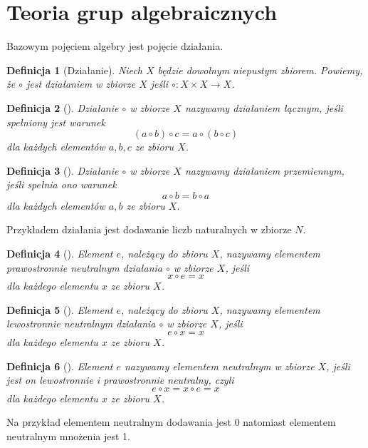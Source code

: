 \documentclass[12pt,a4paper]{report}
\newtheorem{definition}{Definicja}[chapter]
\begin{document}
\section{Teoria grup algebraicznych}

Bazowym pojęciem algebry jest pojęcie działania.

\begin{definition}[Działanie{\citep[Sec 4.1]{jedrzejewski2011algebra}}]
Niech $X$ będzie dowolnym niepustym zbiorem. Powiemy, że $\circ$ jest działaniem w zbiorze $X$ jeśli $\circ: X \times X \to X$.
\end{definition}


\begin{definition}[{\citep[Sec 4.1 Def. 4.3]{jedrzejewski2011algebra}}]
Działanie $\circ$ w zbiorze $X$ nazywamy działaniem łącznym, jeśli spełniony jest warunek 
\begin{equation*}
(a\circ b)\circ c = a\circ(b\circ c)
\end{equation*} 
dla każdych elementów $a,b,c$ ze zbioru $X$.
\end{definition}
\begin{definition}[{\citep[Sec 4.1 Def. 4.4]{jedrzejewski2011algebra}}]
Działanie $\circ$ w zbiorze $X$ nazywamy działaniem przemiennym, jeśli spełnia ono warunek
\begin{equation*}
a\circ b=b\circ a
\end{equation*}
dla każdych elementów $a,b$ ze zbioru $X$.
\end{definition}
Przykładem działania jest dodawanie liczb naturalnych w zbiorze $N$.
\begin{definition}[{\citep[Sec 4.1 Def. 4.6]{jedrzejewski2011algebra}}]
Element $e$, należący do zbioru $X$, nazywamy elementem prawostronnie neutralnym działania $\circ$ w zbiorze $X$, jeśli
\begin{equation*}
x\circ e = x
\end{equation*} 
dla każdego elementu $x$ ze zbioru $X$.
\end{definition}
\begin{definition}[{\citep[Sec 4.1 Def. 4.5]{jedrzejewski2011algebra}}]
Element $e$, należący do zbioru $X$, nazywamy elementem lewostronnie neutralnym działania $\circ$ w zbiorze $X$, jeśli
\begin{equation*}
e\circ x = x
\end{equation*} 
dla każdego elementu $x$ ze zbioru $X$.
\end{definition}
\begin{definition}[{\citep[Sec 4.1 Def. 4.8]{jedrzejewski2011algebra}}]
Element $e$ nazywamy elementem neutralnym w zbiorze $X$, jeśli jest on lewostronnie i prawostronnie neutralny, czyli
\begin{equation*}
e\circ x = x\circ e = x
\end{equation*}
dla każdego elementu $x$ ze zbioru $X$.
\end{definition}
Na przykład elementem neutralnym dodawania jest 0 natomiast elementem neutralnym mnożenia jest 1.
\end{document}

